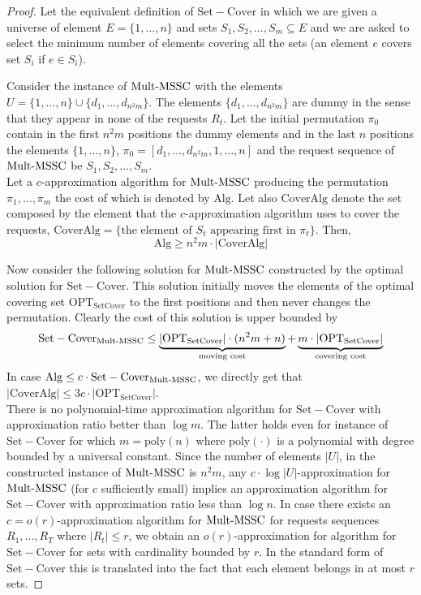 \begin{proof}
Let the equivalent definition of $\mathrm{Set-Cover}$ in which we are given a universe of element $E = \{1,\ldots,n\}$ and sets $S_1,S_2,\ldots,S_m \subseteq E$ and we are asked to select the minimum number of elements covering all the sets (an element $e$ covers set $S_i$ if $e \in S_i$).

Consider the instance of $\mathrm{Mult}\text{-}\mathrm{MSSC}$ with the elements $U= \{1,\ldots,n\} \cup \{d_1,\ldots,d_{n^2m}\}$. The elements $\{d_1,\ldots,d_{n^2m}\}$
are dummy in the sense that
they appear in none of the requests $R_t$. Let the initial permutation $\pi_0$ contain in the first $n^2m$ positions the dummy elements and in the last $n$ positions the elements $\{1,\ldots,n\}$, $\pi_0 = [d_1,\ldots,d_{n^2m},1,\ldots,n]$ and the request sequence of 
$\mathrm{Mult}\text{-}\mathrm{MSSC}$ be $S_1,S_2,\ldots,S_m$.\\

Let a $c$-approximation algorithm for $\mathrm{Mult}\text{-}\mathrm{MSSC}$ producing the permutation $\pi_1,\ldots,\pi_m$ the cost of which is denoted by $\mathrm{Alg}$. Let also $\mathrm{CoverAlg}$ denote the set composed by the element that the $c$-approximation algorithm uses to cover the requests, $\mathrm{CoverAlg} = \{\text{the element of }S_t\text{ appearing first in }\pi_t\}$. Then,
$$\mathrm{Alg} \geq n^2 m \cdot |\mathrm{CoverAlg}|$$


Now consider the following solution 
for $\mathrm{Mult}\text{-}\mathrm{MSSC}$ constructed by the optimal solution for $\mathrm{Set-Cover}$. This solution initially moves the elements of the optimal covering set
$\mathrm{OPT}_\mathrm{SetCover}$ to the first positions and then never changes the permutation. Clearly the cost of this solution is upper bounded by
$$\mathrm{Set-Cover}_{\mathrm{Mult}\text{-}\mathrm{MSSC}} \leq \underbrace{|\mathrm{OPT}_\mathrm{SetCover}| \cdot (n^2m + n)}_{\text{moving cost}} + \underbrace{m\cdot |\mathrm{OPT}_\mathrm{SetCover}|}_{\text{covering cost}}  $$
\noindent In case $\mathrm{Alg} \leq c \cdot \mathrm{Set-Cover}_{\mathrm{Mult}\text{-}\mathrm{MSSC}}$, we directly get that $|\mathrm{CoverAlg}| \leq 3c \cdot |\mathrm{OPT}_\mathrm{SetCover}|$.\\

\noindent There is no polynomial-time approximation algorithm for $\mathrm{Set}-\mathrm{Cover}$ with approximation ratio better than $\log m$. The latter holds even for instance of $\mathrm{Set}-\mathrm{Cover}$ for which $m = \mathrm{poly}(n)$ \cite{alon2006} where $\mathrm{poly}(\cdot)$ is a polynomial with degree bounded by a universal constant. Since the number of elements $|U|$, in the constructed instance of $\mathrm{Mult}\text{-}\mathrm{MSSC}$ is $n^2m$, any $c\cdot \log |U|$-approximation for $\mathrm{Mult}\text{-}\mathrm{MSSC}$ (for $c$ sufficiently small) implies an approximation algorithm for $\mathrm{Set}-\mathrm{Cover}$
with approximation ratio less than $\log n$. In case
there exists an $c=o(r)$-approximation algorithm for $\mathrm{Mult}\text{-}\mathrm{MSSC}$ for requests sequences $R_1,\ldots,R_T$ where $|R_t|\leq r$, we obtain an $o(r)$-approximation for algorithm for $\mathrm{Set-Cover}$ for sets with cardinality bounded by $r$. In the standard form of $\mathrm{Set}-\mathrm{Cover}$ this is translated into the fact that each element belongs in at most $r$ sets.
\end{proof}

